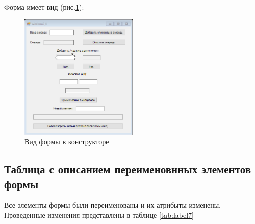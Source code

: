 Форма имеет вид (рис.\ref{fig:FormInConstruct7}):

\newpage

\begin{figure}[!h]
    \centering
    \includegraphics[width = 0.5\textwidth]{images/Task7/FormInConstructor.png}
    \caption{Вид формы в конструкторе}
    \label{fig:FormInConstruct7}
\end{figure}

\subsection{Таблица с описанием переименовнных элементов формы}

Все элементы формы были переименованы и их атрибыты изменены. Проведенные изменения представлены в таблице \ref{tab:label7}

